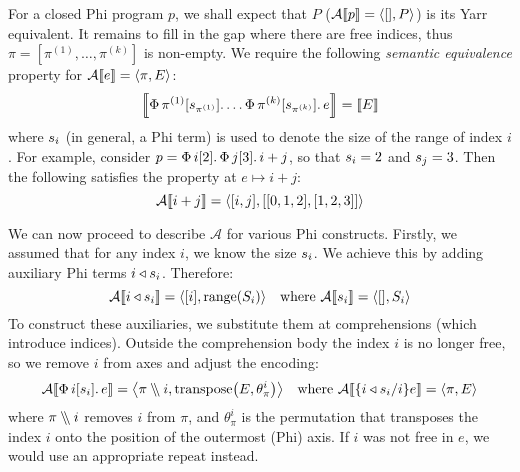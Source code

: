 For a closed Phi program $p$, we shall expect that $P$ ($\mathcal A \denot{p} = \phipair{[]}{P}$) is its Yarr equivalent. It remains to fill in the gap where there are free indices, thus $\pi = \left[ \pi^{(1)}, \dots, \pi^{(k)} \right]$ is non-empty. We require the following \textit{semantic equivalence} property for $\mathcal A \denot e = \phipair{\pi}{E}$:
$$ \denot{\phivec{\pi^{(1)}}{\sizeat{\pi^{(1)}}}{\dots \phivec{\pi^{(k)}}{\sizeat{\pi^{(k)}}}{e}}} = \denot{E}$$
where $s_{i}$ (in general, a Phi term) is used to denote the size of the range of index $i$. For example, consider $p = \Phi\, {i}[{2}] \ldotp {\Phi\, {j}[{3}] \ldotp {i + j}}$, so that $s_{i} = 2$ and $s_{j} = 3$. Then the following satisfies the property at $e \mapsto i + j$:
$$ \mathcal A \denot{i + j} = \phipair{[i, j]}{[[0, 1, 2], [1, 2, 3]]} $$

\newcommand{\sized}[1]{{#1} \triangleleft \sizeat{#1}}
We can now proceed to describe $\mathcal A$ for various Phi constructs. Firstly, we assumed that for any index $i$, we know the size $s_{i}$. We achieve this by adding auxiliary Phi terms $\sized i$. Therefore:
$$ \mathcal A \denot{i \triangleleft \sizeat{i}} 
= \phipair{[i]}{ \mathrm{range} \left( \altsizeat{i} \right) }
\quad 
\text{where } \mathcal A \denot{\sizeat{i}} = \phipair{[]}{\altsizeat{i}} $$
To construct these auxiliaries, we substitute them at comprehensions (which introduce indices). Outside the comprehension body the index $i$ is no longer free, so we  remove $i$ from axes and adjust the encoding:
\newcommand{\dblsetminus}{\mathbin{{\setminus}\mspace{-5mu}{\setminus}}}
$$
\mathcal A \denot{\phivec{i}{\sizeat i}{e}} 
= \phipair{\mathcal \pi \dblsetminus i}{
\mathrm{transpose} \left( E, \theta_\pi^i \right)} 
\quad
\text{where } \mathcal A \denot{\{\sized i / i\} e} 
= \phipair{\pi}{E}
$$
where $\pi \dblsetminus i$ removes $i$ from $\pi$, and $\theta_\pi^i$ is the permutation that transposes the index $i$ onto the position of the outermost (Phi) axis. 
If $i$ was not free in $e$, we would use an appropriate $\mathrm{repeat}$ instead.

